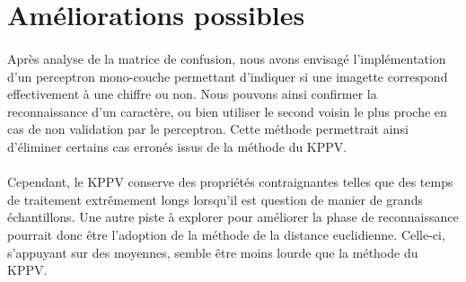 \section{Améliorations possibles}

\paragraph{}
Après analyse de la matrice de confusion, nous avons envisagé l'implémentation d'un perceptron mono-couche permettant d'indiquer si une imagette correspond effectivement à une chiffre ou non. Nous pouvons ainsi confirmer 
la reconnaissance d'un caractère, ou bien utiliser le second voisin le plus proche en cas de non validation par le perceptron. Cette méthode permettrait ainsi d'éliminer certains cas erronés issus de la méthode du KPPV.

\paragraph{}
Cependant, le KPPV conserve des propriétés contraignantes telles que des temps de traitement extrêmement longs lorsqu'il est question de manier de grands échantillons. Une autre piste à explorer pour améliorer la phase de reconnaissance pourrait donc être l'adoption de la méthode de la distance euclidienne. Celle-ci, s'appuyant sur des moyennes, semble être moins lourde que la méthode du KPPV.
\\




